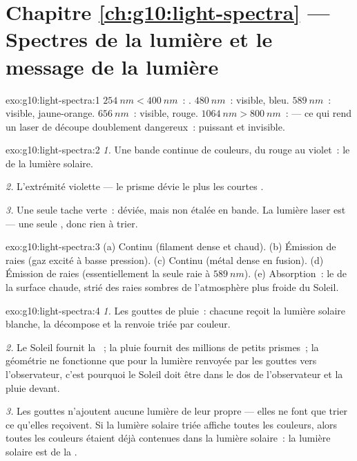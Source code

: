 \section*{Chapitre \ref{ch:g10:light-spectra} --- Spectres de la lumière et le message de la lumière}

\begin{solution}{exo:g10:light-spectra:1}
$\qty{254}{nm} < \qty{400}{nm}$~: . $\qty{480}{nm}$~: visible,
bleu. $\qty{589}{nm}$~: visible, jaune-orange. $\qty{656}{nm}$~: visible,
rouge. $\qty{1064}{nm} > \qty{800}{nm}$~:  --- ce qui rend un
laser de découpe doublement dangereux~: puissant et invisible.
\end{solution}

\begin{solution}{exo:g10:light-spectra:2}
\emph{1.} Une bande continue de couleurs, du rouge au violet~: le
 de la lumière solaire.

\emph{2.} L'extrémité violette --- le prisme dévie le plus les
courtes .

\emph{3.} Une seule tache verte~: déviée, mais non étalée en bande. La
lumière laser est  --- une seule
, donc rien à trier.
\end{solution}

\begin{solution}{exo:g10:light-spectra:3}
(a) Continu (filament dense et chaud). (b) Émission de raies (gaz excité
à basse pression). (c) Continu (métal dense en fusion). (d) Émission de
raies (essentiellement la seule raie à $\qty{589}{nm}$). (e) Absorption~:
le  de la surface chaude, strié des raies sombres
de l'atmosphère plus froide du Soleil.
\end{solution}

\begin{solution}{exo:g10:light-spectra:4}
\emph{1.} Les gouttes de pluie~: chacune reçoit la lumière solaire
blanche, la décompose et la renvoie triée par couleur.

\emph{2.} Le Soleil fournit la ~; la pluie fournit des
millions de petits prismes~; la géométrie ne fonctionne que pour la
lumière renvoyée par les gouttes vers l'observateur, c'est pourquoi le
Soleil doit être dans le dos de l'observateur et la pluie devant.

\emph{3.} Les gouttes n'ajoutent aucune lumière de leur propre --- elles
ne font que trier ce qu'elles reçoivent. Si la lumière solaire triée
affiche toutes les couleurs, alors toutes les couleurs étaient déjà
contenues dans la lumière solaire~: la lumière solaire est de la
.
\end{solution}

